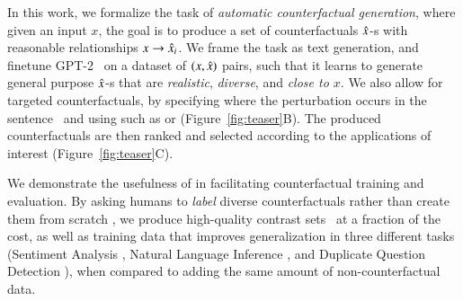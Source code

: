 In this work, we formalize the task of \emph{automatic counterfactual generation}, where given an input $x$, the goal is to produce a set of counterfactuals $\hat{x}$-s with reasonable relationships $x \rightarrow \hat{x}_i$. 
We frame the task as text generation, and finetune GPT-2~\cite{radford2019language} on a dataset of  $(x, \hat{x})$ pairs, such that it learns to generate general purpose $\hat{x}$-s that are \emph{realistic}, \emph{diverse}, and \emph{close to $x$}.
We also allow for targeted counterfactuals, by specifying where the perturbation occurs in the sentence~\cite{donahue2020enabling} and using \tagstrs such as  or  (Figure~\ref{fig:teaser}B). 
The produced counterfactuals are then ranked and selected according to the applications of interest (Figure~\ref{fig:teaser}C).

We demonstrate the usefulness of \sysname in facilitating counterfactual training and evaluation. 
By asking humans to \emph{label} diverse counterfactuals rather than create them from scratch \cite{gardner2020contrast, kaushik2019learning}, we produce high-quality contrast sets~\cite{gardner2020contrast} at a fraction of the cost, as well as training data that improves generalization in three different tasks (Sentiment Analysis \sst, Natural Language Inference \nli, and Duplicate Question Detection \qqp), when compared to adding the same amount of non-counterfactual data.



